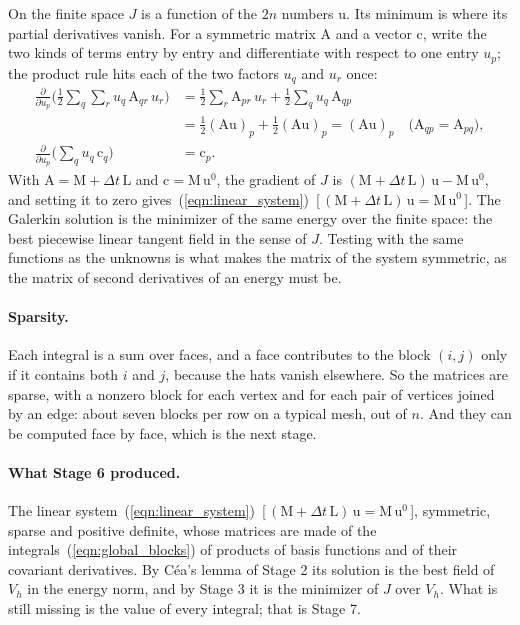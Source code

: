 On the finite space $J$ is a function of the $2n$ numbers $\mathrm u$. Its minimum is where its partial derivatives vanish. For a symmetric matrix $\mathrm A$ and a vector $\mathrm c$, write the two kinds of terms entry by entry and differentiate with respect to one entry $u_p$; the product rule hits each of the two factors $u_q$ and $u_r$ once:
\begin{align*}
\frac{\partial}{\partial u_p}\Big(\frac12\sum_{q}\sum_{r} u_q\, \mathrm A_{qr}\, u_r\Big) &= \frac12\sum_{r} \mathrm A_{pr}\, u_r + \frac12\sum_{q} u_q\, \mathrm A_{qp} \\
&= \frac12 (\mathrm A\mathrm u)_p + \frac12 (\mathrm A\mathrm u)_p = (\mathrm A\mathrm u)_p \quad \text{($\mathrm A_{qp} = \mathrm A_{pq}$)},\\
\frac{\partial}{\partial u_p}\Big(\sum_q u_q\, \mathrm c_q\Big) &= \mathrm c_p .
\end{align*}
With $\mathrm A = \mathrm M + \Delta t\,\mathrm L$ and $\mathrm c = \mathrm M\,\mathrm u^0$, the gradient of $J$ is $(\mathrm M + \Delta t\,\mathrm L)\,\mathrm u - \mathrm M\,\mathrm u^0$, and setting it to zero gives~(\ref{eqn:linear_system})~[\,$(\mathrm M + \Delta t\,\mathrm L)\,\mathrm u = \mathrm M\,\mathrm u^0$\,]. The Galerkin solution is the minimizer of the same energy over the finite space: the best piecewise linear tangent field in the sense of $J$. Testing with the same functions as the unknowns is what makes the matrix of the system symmetric, as the matrix of second derivatives of an energy must be.

\paragraph{Sparsity.} Each integral is a sum over faces, and a face contributes to the block $(i, j)$ only if it contains both $i$ and $j$, because the hats vanish elsewhere. So the matrices are sparse, with a nonzero block for each vertex and for each pair of vertices joined by an edge: about seven blocks per row on a typical mesh, out of $n$. And they can be computed face by face, which is the next stage.

\paragraph{What Stage 6 produced.} The linear system~(\ref{eqn:linear_system})~[\,$(\mathrm M + \Delta t\,\mathrm L)\,\mathrm u = \mathrm M\,\mathrm u^0$\,], symmetric, sparse and positive definite, whose matrices are made of the integrals~(\ref{eqn:global_blocks}) of products of basis functions and of their covariant derivatives. By C\'ea's lemma of Stage 2 its solution is the best field of $V_h$ in the energy norm, and by Stage 3 it is the minimizer of $J$ over $V_h$. What is still missing is the value of every integral; that is Stage 7.

